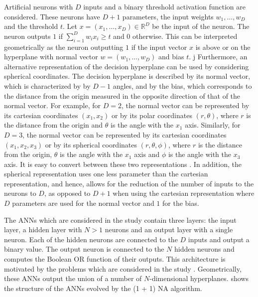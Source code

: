 Artificial neurons with $D$ inputs and a binary threshold activation function are considered.
These neurons have $D + 1$ parameters, the input weights $w_1, \ldots, w_D$ and the threshold $t$.
Let $x = (x_1, \ldots, x_D) \in \mathds{R}^D$ be the input of the neuron. The neuron outputs $1$ if $\sum_{i=1}^D w_i x_i \geq t$ and $0$
otherwise.
This can be interpreted geometrically as the neuron outputting $1$ if the input vector $x$ is above or on the hyperplane with normal vector
$w = (w_1, \ldots, w_D)$ and bias $t$.
j
Furthermore, an alternative representation of the decision hyperplane can be used by considering spherical coordinates.
The decision hyperplane is described by its normal vector, which is characterized by by $D - 1$ angles, and by the bias, which corresponds to the distance from the origin
measured in the opposite direction of that of the normal vector.
For example, for $D = 2$, the normal vector can be represented by its cartesian coordinates $(x_1, x_2)$ or by its polar coordinates
$(r, \theta)$, where $r$ is the distance from the origin and $\theta$ is the angle with the $x_1$ axis. Similarly, for $D = 3$, the normal vector can
be represented by its cartesian coordinates $(x_1, x_2, x_3)$ or by its spherical coordinates $(r, \theta, \phi)$, where $r$ is the distance from the
origin, $\theta$ is the angle with the $x_1$ axis and $\phi$ is the angle with the $x_3$ axis.
It is easy to convert between these two representations \cite{spherical}. In addition, the spherical representation uses one less parameter than the cartesian
representation, and hence, allows for the reduction of the number of inputs to the neurons to $D$, as opposed to $D + 1$ when using the cartesian representation
where $D$ parameters are used for the normal vector and $1$ for the bias.


The ANNs which are considered in the study contain three layers: the input layer, a hidden layer with $N > 1$ neurons and an output layer with a single neuron.
Each of the hidden neurons are connected to the $D$ inputs and output a binary value. The output neuron is connected to the $N$ hidden neurons and
computes the Boolean OR function of their outputs.
This architecture is motivated by the problems which are considered in the study \cite{na}.
Geometrically, these ANNs output the union of a number of $N$-dimensional hyperplanes.
 shows the structure of the ANNs evolved by the (1 + 1) NA algorithm.

